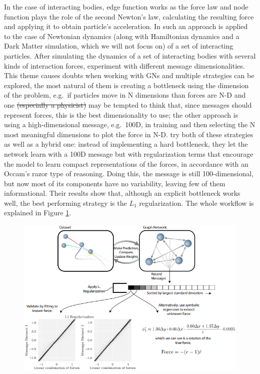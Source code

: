 \documentclass[../../master_thesis_np.tex]{subfiles}
\begin{document}
	In the case of interacting bodies, edge function works as the force law and node function plays the role of the second Newton's law, calculating the resulting force and applying it to obtain particle's acceleration. 
	In \cite{cranmer_discovering_2020} such an approach is applied to the case of Newtonian dynamics (along with Hamiltonian dynamics and a Dark Matter simulation, which we will not focus on) of a set of interacting particles. 
	After simulating the dynamics of a set of interacting bodies with several kinds of interaction forces, \citeauthor{cranmer_discovering_2020} experiment with different message dimensionalities. 
	This theme causes doubts when working with GNs and multiple strategies can be explored, the most natural of them is creating a bottleneck using the dimension of the problem, e.g.~if particles move in N dimensions than forces are N-D and one \sout{(especially a physicist)} may be tempted to think that, since messages should represent forces, this is the best dimensionality to use; the other approach is using a high-dimensional message, e.g.~100D, in training and then selecting the N most meaningful dimensions to plot the force in N-D. 
	\citeauthor{cranmer_discovering_2020} try both of these strategies as well as a hybrid one: instead of implementing a hard bottleneck, they let the network learn with a 100D message but with regularization terms that encourage the model to learn compact representations of the forces, in accordance with an Occam's razor type of reasoning. 
	Doing this, the message is still 100-dimensional, but now most of its components have no variability, leaving few of them informational. 
	Their results show that, although an explicit bottleneck works well, the best performing strategy is the $L_1$ regularization. 
	The whole workflow is explained in Figure \ref{fig:cranmer1}.
	
	 \begin{figure}[htp]
		\centering
		\includegraphics[width=\singfigwidth]{cranmer1.png}
		\caption{\cite{cranmer_discovering_2020}}
		\label{fig:cranmer1}
	\end{figure}
	
\end{document}
